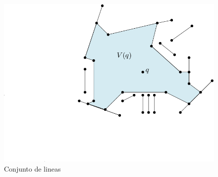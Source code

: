 \documentclass[aspectratio=169,xcolor=dvipsnames, t]{beamer}
\begin{document}
\begin{frame}
\begin{columns}[t]
        \begin{column}{0.33\textwidth}
          \begin{figure}
            \hspace*{-1.5cm}
                \centering
                \includegraphics[width=1.15\textwidth]{imagenes/Caso2.1c.png}
                \caption{Conjunto de lineas}
            \end{figure}
        \end{column}
    \end{columns}
\end{frame}
\end{document}
